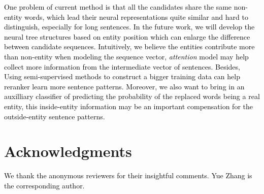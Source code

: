 \documentclass[11pt,a4paper]{article}
\begin{document}
\textcolor{black}{
One problem of current method is that all the candidates share the same non-entity words, which lead their neural representations quite similar and hard to distinguish, especially for long sentences. In the future work, we will develop the neural tree structures based on entity position which can enlarge the difference between candidate sequences. Intuitively, we believe the entities contribute more than non-entity when modeling the sequence vector, \textit{attention} model \cite{bahdanau2014neural} may help collect more information from the intermediate vector of sentences. Besides, Using semi-supervised methods to construct a bigger training data can help reranker learn more sentence patterns. Moreover, we also want to bring in an auxilliary classifier of predicting the probability of the replaced words being a real entity, this inside-entity information may be an important compensation for the outside-entity sentence patterns.
}



\section*{Acknowledgments}
\textcolor{black}{
We thank the anonymous reviewers for their insightful comments. Yue Zhang is the corresponding author.
}



\end{document}
